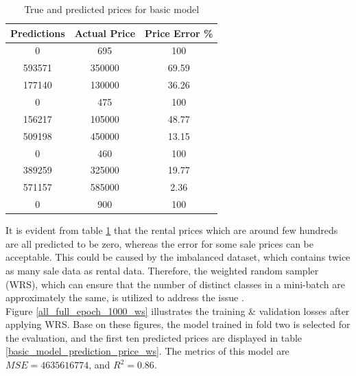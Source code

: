 \documentclass[12pt,twoside]{report}
\begin{document}
\begin{table}[!htbp]
	\centering
	\caption{ True and predicted prices for basic model}
	\label{basic_model_prediction_price}
	\begin{tabular}{| c | c | c |}
		\hline
		Predictions & Actual Price & Price Error \% \\
		\hline
		0 & 695 & 100 \\
		\hline
		593571 & 350000 & 69.59 \\
		\hline
		177140 & 130000 & 36.26 \\
		\hline
		0 & 475 & 100 \\
		\hline
		156217 & 105000 & 48.77 \\
		\hline
		509198 & 450000 & 13.15 \\
		\hline
		0 & 460 & 100 \\ 
		\hline
		389259 & 325000 & 19.77 \\
		\hline
		571157 & 585000 & 2.36 \\
		\hline
		0 & 900 & 100 \\
		\hline
	\end{tabular}
\end{table}

 It is evident from table \ref{basic_model_prediction_price} that the rental prices which are around few hundreds are all predicted to be zero, whereas the error for some sale prices can be acceptable. This could be caused by the imbalanced dataset, which contains twice as many sale data as rental data. Therefore, the weighted random sampler (WRS), which can ensure that the number of distinct classes in a mini-batch are approximately the same, is utilized to address the issue .
 \\
 
Figure \ref{all_full_epoch_1000_ws} illustrates the training \& validation losses after applying WRS. Base on these figures, the model trained in fold two is selected for the evaluation, and the first ten predicted prices are displayed in table \ref{basic_model_prediction_price_ws}. The metrics of this model are $MSE = 4635616774$, and $R^2 = 0.86$. 
\end{document}
